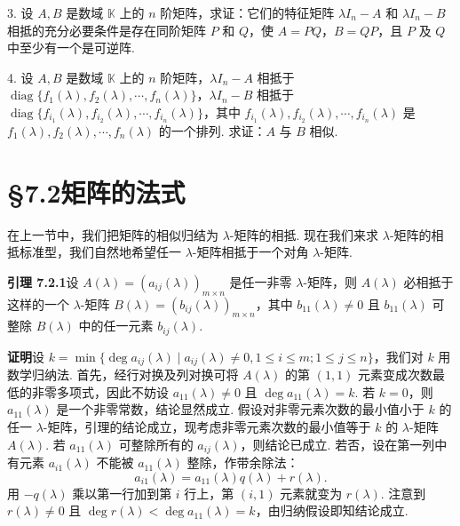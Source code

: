 \documentclass[UTF8, 12pt, fontset=fandol, oneside]{ctexart}
\begin{document}
3. 设 $A,B$ 是数域 $\mathbb{K}$ 上的 $n$ 阶矩阵，求证：它们的特征矩阵 $\lambda I_n-A$ 和 $\lambda I_n-B$ 相抵的充分必要条件是存在同阶矩阵 $P$ 和 $Q$，使 $A=PQ$，$B=QP$，且 $P$ 及 $Q$ 中至少有一个是可逆阵.

4. 设 $A,B$ 是数域 $\mathbb{K}$ 上的 $n$ 阶矩阵，$\lambda I_n-A$ 相抵于 $\operatorname{diag}\{f_1(\lambda),f_2(\lambda),\cdots,f_n(\lambda)\}$，$\lambda I_n-B$ 相抵于 $\operatorname{diag}\{f_{i_1}(\lambda),f_{i_2}(\lambda),\cdots,f_{i_n}(\lambda)\}$，其中 $f_{i_1}(\lambda),f_{i_2}(\lambda),\cdots,f_{i_n}(\lambda)$ 是 $f_1(\lambda),f_2(\lambda),\cdots,f_n(\lambda)$ 的一个排列. 求证：$A$ 与 $B$ 相似.

\section*{§7.2\quad 矩阵的法式}

在上一节中，我们把矩阵的相似归结为 $\lambda$-矩阵的相抵. 现在我们来求 $\lambda$-矩阵的相抵标准型，我们自然地希望任一 $\lambda$-矩阵相抵于一个对角 $\lambda$-矩阵.

\noindent\textbf{引理 7.2.1}\quad 设 $A(\lambda)=(a_{ij}(\lambda))_{m\times n}$ 是任一非零 $\lambda$-矩阵，则 $A(\lambda)$ 必相抵于这样的一个 $\lambda$-矩阵 $B(\lambda)=(b_{ij}(\lambda))_{m\times n}$，其中 $b_{11}(\lambda)\neq 0$ 且 $b_{11}(\lambda)$ 可整除 $B(\lambda)$ 中的任一元素 $b_{ij}(\lambda)$.

\noindent\textbf{证明}\quad 设 $k=\min\{\deg a_{ij}(\lambda)\mid a_{ij}(\lambda)\neq 0,1\leq i\leq m;1\leq j\leq n\}$，我们对 $k$ 用数学归纳法. 首先，经行对换及列对换可将 $A(\lambda)$ 的第 $(1,1)$ 元素变成次数最低的非零多项式，因此不妨设 $a_{11}(\lambda)\neq 0$ 且 $\deg a_{11}(\lambda)=k$. 若 $k=0$，则 $a_{11}(\lambda)$ 是一个非零常数，结论显然成立. 假设对非零元素次数的最小值小于 $k$ 的任一 $\lambda$-矩阵，引理的结论成立，现考虑非零元素次数的最小值等于 $k$ 的 $\lambda$-矩阵 $A(\lambda)$. 若 $a_{11}(\lambda)$ 可整除所有的 $a_{ij}(\lambda)$，则结论已成立. 若否，设在第一列中有元素 $a_{i1}(\lambda)$ 不能被 $a_{11}(\lambda)$ 整除，作带余除法：
\[
a_{i1}(\lambda)=a_{11}(\lambda)q(\lambda)+r(\lambda).
\]
用 $-q(\lambda)$ 乘以第一行加到第 $i$ 行上，第 $(i,1)$ 元素就变为 $r(\lambda)$. 注意到 $r(\lambda)\neq 0$ 且 $\deg r(\lambda)<\deg a_{11}(\lambda)=k$，由归纳假设即知结论成立.
\end{document}
